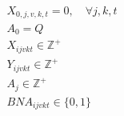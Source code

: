 \begin{align}
	 & X_{0,j,v,k,t} = 0,     \quad \forall j,k,t                                                                                                                                                                     \label{eq: m1_ini_assig}                   \\
	 & A_{0} = Q                                                                                                                                                                                                      \label{eq: m1_ini_disponi}                 \\
	 & X_{ijvkt} \in \mathbb{Z}^+                                                                                                                                                                                     \label{eq: m1_dom_assig}                   \\
	 & Y_{ijvkt} \in \mathbb{Z}^+                                                                                                                                                                                     \label{eq: m1_dom_autho}                   \\
	 & A_{j} \in \mathbb{Z}^+                                                                                                                                                                                         \label{eq: m1_dom_disponi}                 \\
	 & BNA_{ijvkt} \in \{0,1\}                                                                                                                                                                                        \label{eq: m1_dom_bin_nadja}
\end{align}


